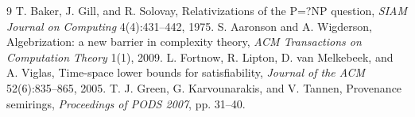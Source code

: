 \documentclass[11pt]{article}
\begin{document}
\begin{thebibliography}{9}
T. Baker, J. Gill, and R. Solovay,
Relativizations of the P=?NP question,
\emph{SIAM Journal on Computing} 4(4):431--442, 1975.
S. Aaronson and A. Wigderson,
Algebrization: a new barrier in complexity theory,
\emph{ACM Transactions on Computation Theory} 1(1), 2009.
L. Fortnow, R. Lipton, D. van Melkebeek, and A. Viglas,
Time-space lower bounds for satisfiability,
\emph{Journal of the ACM} 52(6):835--865, 2005.
T. J. Green, G. Karvounarakis, and V. Tannen,
Provenance semirings,
\emph{Proceedings of PODS 2007}, pp. 31--40.
\end{thebibliography}
\end{document}

